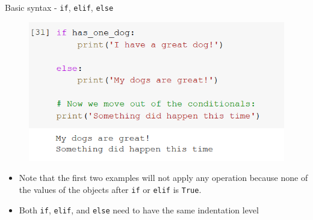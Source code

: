 \documentclass[aspectratio=169]{beamer}
\begin{document}
\begin{frame}{Basic syntax - \texttt{if}, \texttt{elif}, \texttt{else}}
\begin{multicols}{3}
\begin{figure}
			\centering
			\includegraphics[width=\linewidth]{img/if_else.png}
		\end{figure}

	\end{multicols}

	\begin{itemize}
		\item Note that the first two examples will not apply any operation because none of the values of the objects after \texttt{if} or \texttt{elif} is \texttt{True}.
		\item Both \texttt{if}, \texttt{elif}, and \texttt{else} need to have the same indentation level
	\end{itemize}

\end{frame}
\end{document}
